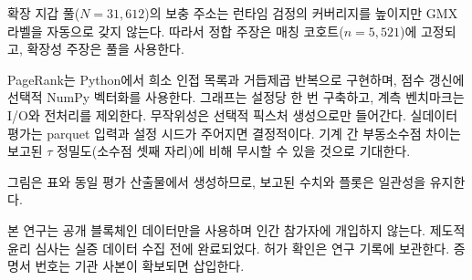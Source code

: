 확장 지갑 풀($N=31{,}612$)의 보충 주소는 런타임 검정의 커버리지를 높이지만 GMX 라벨을 자동으로 갖지 않는다. 따라서 정합 주장은 매칭 코호트($n=5{,}521$)에 고정되고, 확장성 주장은 풀을 사용한다.


PageRank는 Python에서 희소 인접 목록과 거듭제곱 반복으로 구현하며, 점수 갱신에 선택적 NumPy 벡터화를 사용한다. 그래프는 설정당 한 번 구축하고, 계측 벤치마크는 I/O와 전처리를 제외한다. 무작위성은 선택적 픽스처 생성으로만 들어간다. 실데이터 평가는 parquet 입력과 설정 시드가 주어지면 결정적이다. 기계 간 부동소수점 차이는 보고된 $\tau$ 정밀도(소수점 셋째 자리)에 비해 무시할 수 있을 것으로 기대한다.

그림은 표와 동일 평가 산출물에서 생성하므로, 보고된 수치와 플롯은 일관성을 유지한다.


본 연구는 공개 블록체인 데이터만을 사용하며 인간 참가자에 개입하지 않는다. 제도적 윤리 심사는 실증 데이터 수집 전에 완료되었다. 허가 확인은 연구 기록에 보관한다. 증명서 번호는 기관 사본이 확보되면 삽입한다.

